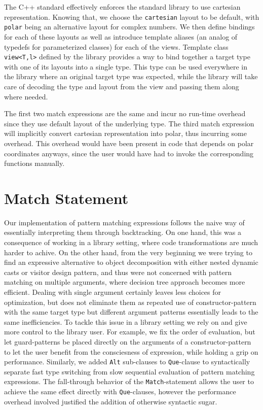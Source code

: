 \documentclass[preprint]{sigplanconf}
\makeatletter
\DeclareRobustCommand{\code}[1]{{\lstinline[breaklines=false,escapechar=@]{#1}}}
\makeatother
\begin{document}
\noindent
The C++ standard effectively enforces the standard library to use cartesian 
representation\cite[-4]{C++11}. Knowing that, we choose the 
\code{cartesian} layout to be default, with \code{polar} being an alternative 
layout for complex numbers. We then define bindings for each of these layouts as 
well as introduce template aliases (an analog of typedefs for parameterized 
classes) for each of the views. Template class \code{view<T,l>} defined by the 
library provides a way to bind together a target type with one of its layouts 
into a single type. This type can be used everywhere in the library where an 
original target type was expected, while the library will take care of decoding 
the type and layout from the view and passing them along where needed.

The first two match expressions are the same and incur no run-time overhead 
since they use default layout of the underlying type. The third match expression 
will implicitly convert cartesian representation into polar, thus incurring some 
overhead. This overhead would have been present in code that depends on polar 
coordinates anyways, since the user would have had to invoke the corresponding 
functions manually.

\section{Match Statement} %
\label{sec:impl}

Our implementation of pattern matching expressions follows the naive way of 
essentially interpreting them through backtracking. On one hand, this was a 
consequence of working in a library setting, where code transformations are much 
harder to achive. On the other hand, from the very beginning we were trying to 
find an expressive alternative to object decomposition with either nested 
dynamic casts or visitor design pattern, and thus were not concerned with 
pattern matching on multiple arguments, where decision tree approach becomes 
more efficient. Dealing with single argument certainly leaves less choices for 
optimization, but does not eliminate them as repeated use of constructor-pattern 
with the same target type but different argument patterns essentially leads to 
the same inefficiencies. To tackle this issue in a library setting we rely on 
and give more control to the library user. For example, we fix the order of 
evaluation, but let guard-patterns be placed directly on the arguments of a 
constructor-pattern to let the user benefit from the consciesness of expression, 
while holding a grip on performance. Similarly, we added \code{Alt} sub-clauses 
to \code{Que}-clause to syntactically separate fast type switching from slow 
sequential evaluation of pattern matching expressions. The fall-through behavior 
of the \code{Match}-statement allows the user to achieve the same effect 
directly with \code{Que}-clauses, however the performance overhead involved 
justified the addition of otherwise syntactic sugar.
\end{document}
